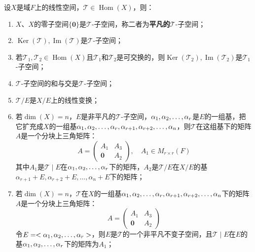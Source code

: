 \begin{property}\label{prop:InvariantSubspace}
	设$X$是域$F$上的线性空间，$\mathcal{T}\in\operatorname{Hom}(X)$，则：
	\begin{enumerate}
		\item $X$、$X$的零子空间$\{\mathbf{0}\}$是$\mathcal{T}$-子空间，称二者为\textbf{平凡的}$\mathcal{T}$-子空间；
		\item $\operatorname{Ker}(\mathcal{T}),\operatorname{Im}(\mathcal{T})$是$\mathcal{T}$-子空间；
		\item 若$\mathcal{T}_1,\mathcal{T}_2\in\operatorname{Hom}(X)$且$\mathcal{T}_1$和$\mathcal{T}_2$是可交换的，则$\operatorname{Ker}(\mathcal{T}_2),\operatorname{Im}(\mathcal{T}_2)$是$\mathcal{T}_1$-子空间；
		\item $\mathcal{T}$-子空间的和与交是$\mathcal{T}$-子空间；
		\item $\mathcal{T}/E$是$X/E$上的线性变换；
		\item 若$\dim(X)=n$，$E$是非平凡的$\mathcal{T}$-子空间，$\alpha_1, \alpha_2, \dots, \alpha_{r}$是$E$的一组基，把它扩充成$X$的一组基$\alpha_1, \alpha_2, \dots, \alpha_{r},\alpha_{r+1},\alpha_{r+2},\dots,\alpha_n$，则$\mathcal{T}$在这组基下的矩阵$A$是一个分块上三角矩阵：
		\begin{equation*}
			A=\begin{pmatrix}
				A_1 & A_3 \\
				\mathbf{0} & A_2
			\end{pmatrix},\quad A_1\in M_{r\times r}(F)
		\end{equation*}
		其中$A_1$是$\mathcal{T}\mid E$在$\alpha_1, \alpha_2, \dots, \alpha_{r}$下的矩阵，$A_2$是$\mathcal{T}/E$在$X/E$的基$\alpha_{r+1}+E,\alpha_{r+2}+E,\dots,\alpha_n+E$下的矩阵；
		\item 若$\dim(X)=n$，$\mathcal{T}$在$X$的一组基$\alpha_1, \alpha_2, \dots, \alpha_{r},\alpha_{r+1},\alpha_{r+2},\dots,\alpha_n$下的矩阵$A$是一个分块上三角矩阵：
		\begin{equation*}
			A=\begin{pmatrix}
				A_1 & A_3 \\
				\mathbf{0} & A_2
			\end{pmatrix}
		\end{equation*}
		令$E=<\alpha_1, \alpha_2, \dots, \alpha_{r}>$，则$E$是$\mathcal{T}$的一个非平凡不变子空间，且$\mathcal{T}\mid E$在$E$的基$\alpha_1, \alpha_2, \dots, \alpha_{r}$下的矩阵为$A_1$；
	\end{enumerate}
\end{property}
